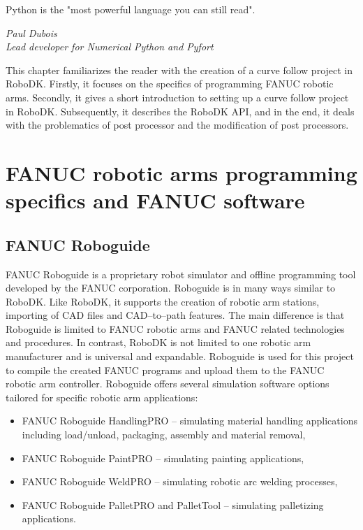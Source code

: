 \label{chap:implementation}

\epigraph{Python is the "most powerful language you can still read".}{\textit{Paul Dubois \\ Lead developer for Numerical Python and Pyfort }}

This chapter familiarizes the reader with the creation of a curve follow project in RoboDK. Firstly, it focuses on the specifics of programming FANUC robotic arms. Secondly, it gives a short introduction to setting up a curve follow project in RoboDK. Subsequently, it describes the RoboDK API, and in the end, it deals with the problematics of post processor and the modification of post processors.

\section{FANUC robotic arms programming specifics and FANUC software}

\subsection{FANUC Roboguide}

FANUC Roboguide is a proprietary robot simulator and offline programming tool developed by the FANUC corporation. Roboguide is in many ways similar to RoboDK.  Like RoboDK, it supports the creation of robotic arm stations, importing of CAD files and CAD--to--path features. The main difference is that Roboguide is limited to FANUC robotic arms and FANUC related technologies and procedures. In contrast, RoboDK is not limited to one robotic arm manufacturer and is universal and expandable. Roboguide is used for this project to compile the created FANUC programs and upload them to the FANUC robotic arm controller. Roboguide offers several simulation software options tailored for specific robotic arm applications:

\begin{itemize}

\item FANUC Roboguide HandlingPRO -- simulating material handling applications including load/unload, packaging, assembly and material removal,
\item FANUC Roboguide PaintPRO -- simulating painting applications,
\item FANUC Roboguide WeldPRO -- simulating robotic arc welding processes,
\item FANUC Roboguide PalletPRO and PalletTool -- simulating palletizing applications.

\end{itemize}

